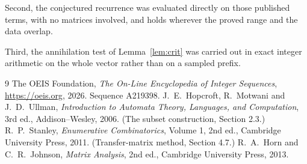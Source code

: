 \documentclass[11pt,a4paper]{article}
\theoremstyle{plain}
\theoremstyle{definition}
\begin{document}
Second, the conjectured recurrence was evaluated directly on those published terms, with no
matrices involved, and holds wherever the proved range and the data overlap.

Third, the annihilation test of Lemma~\ref{lem:crit} was carried out in exact integer
arithmetic on the whole vector rather than on a sampled prefix.

\begin{thebibliography}{9}
 The OEIS Foundation, \emph{The On-Line Encyclopedia of Integer
Sequences}, \url{https://oeis.org}, 2026. Sequence A219398.
 J.~E.~Hopcroft, R.~Motwani and J.~D.~Ullman, \emph{Introduction to Automata
Theory, Languages, and Computation}, 3rd ed., Addison--Wesley, 2006. (The subset
construction, Section 2.3.)
 R.~P.~Stanley, \emph{Enumerative Combinatorics}, Volume 1, 2nd ed.,
Cambridge University Press, 2011. (Transfer-matrix method, Section 4.7.)
 R.~A.~Horn and C.~R.~Johnson, \emph{Matrix Analysis}, 2nd ed., Cambridge
University Press, 2013.
\end{thebibliography}
\end{document}
